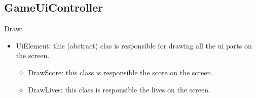 \documentclass[10pt]{article}
\begin{document}
\subsection*{GameUiController}
Draw:
\begin{itemize}
	\item UiElement: this (abstract) clas is responsible for drawing all the ui parts on the screen.
	\begin{itemize}
		\begin{itemize}
			\item UiUnit: this abstract class is responsible for the units on the screen.
				\begin{itemize}
					\item UiAlien: this class is responsible for drawing the aliens on the screen.
					\item UiSpaceShip: this class is responsible for drawing the spaceship on the screen.
					\item UiBarricade: this class is responsible for drawing the barricades on the screen.
					\item UiExplosion: this class is responsible for drawing the explosions on the screen.
					\item UiBullet: this abstract class is responsible for drawing the bullets on the screen.
					\begin{itemize}
						\item UiSpaceShipBullet: this class is responsible for drawing the SpaceShipBullets on the screen.
						\item UiShipBullet: this class is responsible for drawing the SpaceShipBullets on the screen.
					\end{itemize}
				\end{itemize}
		\end{itemize}
		\item DrawScore: this class is responsible the score on the screen.
		\item DrawLives: this class is responsible the lives on the screen.
	\end{itemize}
\end{itemize}
\end{document}
